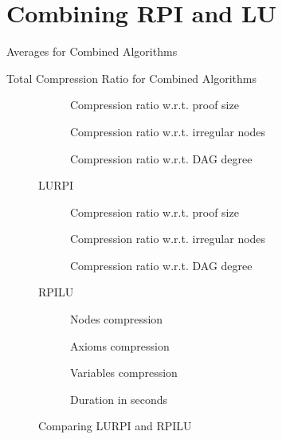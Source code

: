 \section{Combining RPI and LU}
\begin{table}[hbt]
  \centering
  \caption{Averages for Combined Algorithms}
\end{table}
\begin{table}[hbt]
  \centering
  \caption{Total Compression Ratio for Combined Algorithms}
\end{table}
\begin{figure}[hbt]
  \begin{subfigure}{\textwidth}
    \centering
    \caption{Compression ratio w.r.t. proof size}
  \end{subfigure}
  \begin{subfigure}{\textwidth}
    \centering
    \caption{Compression ratio w.r.t. irregular nodes}
  \end{subfigure}
  \begin{subfigure}{\textwidth}
    \centering
    \caption{Compression ratio w.r.t. DAG degree}
  \end{subfigure}
  \caption{LURPI}
\end{figure}
\begin{figure}[hbt]
  \begin{subfigure}{\textwidth}
    \centering
    \caption{Compression ratio w.r.t. proof size}
  \end{subfigure}
  \begin{subfigure}{\textwidth}
    \centering
    \caption{Compression ratio w.r.t. irregular nodes}
  \end{subfigure}
  \begin{subfigure}{\textwidth}
    \centering
    \caption{Compression ratio w.r.t. DAG degree}
  \end{subfigure}
  \caption{RPILU}
\end{figure}
\begin{figure}[hbt]
  \begin{subfigure}{0.5\textwidth}
    \centering
    \caption{Nodes compression}
  \end{subfigure}
  \begin{subfigure}{0.5\textwidth}
    \centering
    \caption{Axioms compression}
  \end{subfigure}
  \begin{subfigure}{0.5\textwidth}
    \centering
    \caption{Variables compression}
  \end{subfigure}
  \begin{subfigure}{0.5\textwidth}
    \centering
    \caption{Duration in seconds}
  \end{subfigure}
  \caption{Comparing LURPI and RPILU}
\end{figure}
